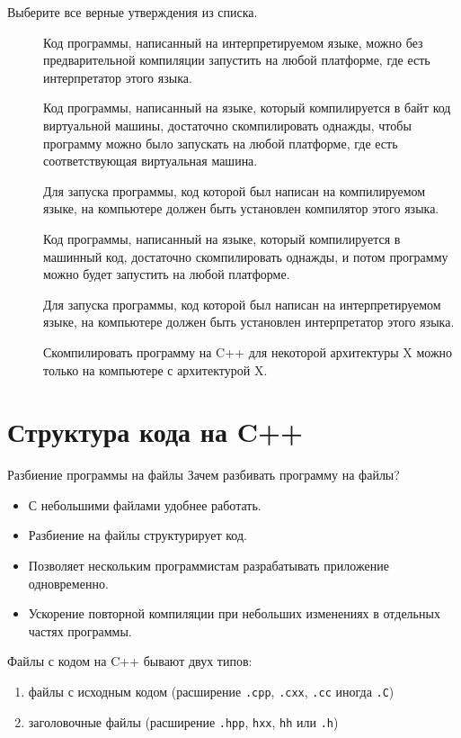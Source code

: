 \documentclass[
    9pt,
    hyperref={pdfencoding=unicode}
    ]{beamer}
\begin{document}
\begin{frame}
    Выберите все верные утверждения из списка.
    \begin{description}
        \item[\XBox]  Код программы, написанный на интерпретируемом языке, можно без предварительной компиляции запустить на любой платформе, где есть интерпретатор этого языка.
        \item[\XBox]  Код программы, написанный на языке, который компилируется в байт код виртуальной машины, достаточно скомпилировать однажды, чтобы программу можно было запускать на любой платформе, где есть соответствующая виртуальная машина.
        \item[\Square]  Для запуска программы, код которой был написан на компилируемом языке, на компьютере должен быть установлен компилятор этого языка.
        \item[\Square]  Код программы, написанный на языке, который компилируется в машинный код, достаточно скомпилировать однажды, и потом программу можно будет запустить на любой платформе.
        \item[\XBox] Для запуска программы, код которой был написан на интерпретируемом языке, на компьютере должен быть установлен интерпретатор этого языка.
        \item[\Square] Скомпилировать программу на C++ для некоторой архитектуры X можно только на компьютере с архитектурой X.
    \end{description}
\end{frame}

\section{Структура кода на C++}
\begin{frame}{Разбиение программы на файлы}
    Зачем разбивать программу на файлы?
    \begin{itemize}
        \item С небольшими файлами удобнее работать.
        \item Разбиение на файлы структурирует код.
        \item Позволяет нескольким программистам разрабатывать приложение одновременно.
        \item Ускорение повторной компиляции при небольших изменениях в отдельных частях программы.
    \end{itemize}
    Файлы с кодом на C++ бывают двух типов:
    \begin{enumerate}
        \item файлы с исходным кодом (расширение \texttt{.cpp}, \texttt{.cxx}, \texttt{.cc} иногда \texttt{.C})
        \item заголовочные файлы (расширение \texttt{.hpp}, \texttt{hxx}, \texttt{hh}  или \texttt{.h})
    \end{enumerate}
\end{frame}
\end{document}
